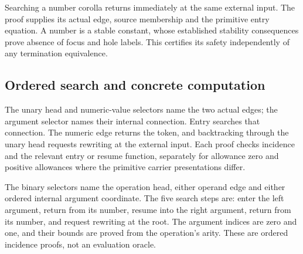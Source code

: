 


Searching a number corolla returns immediately at the same external
input. The proof supplies its actual edge, source membership and the primitive
entry equation. A number is a stable constant, whose established stability
consequences prove absence of focus and hole labels. This certifies its
safety independently of any termination equivalence.



\subsection{Ordered search and concrete computation}

The unary head and numeric-value selectors name the two actual edges;
the argument selector names their internal connection. Entry searches that
connection. The numeric edge returns the token, and backtracking through the
unary head requests rewriting at the external input. Each proof checks
incidence and the relevant entry or resume function, separately for allowance
zero and positive allowances where the primitive carrier presentations differ.







The binary selectors name the operation head, either operand edge
and either ordered internal argument coordinate. The five search steps are:
enter the left argument, return from its number, resume into the right
argument, return from its number, and request rewriting at the root. The
argument indices are zero and one, and their bounds are proved from the
operation's arity. These are ordered incidence proofs, not an evaluation
oracle.

